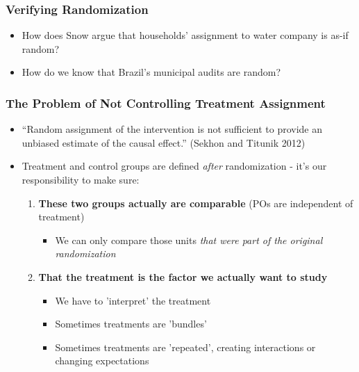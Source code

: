 \documentclass[xcolor=x11names,compress]{beamer}\usepackage[]{graphicx}\usepackage[]{color}
\renewcommand{\(}{\begin{columns}}
\renewcommand{\)}{\end{columns}}
\newcommand{\<}[1]{\begin{column}{#1}}
\renewcommand{\>}{\end{column}}
\begin{document}
\begin{frame}
\frametitle{Verifying Randomization}
\begin{itemize}
\item How does Snow argue that households' assignment to water company is as-if random?
\pause
\item How do we know that Brazil's municipal audits are random?
\end{itemize}
\end{frame}


\begin{frame}
\frametitle{The Problem of Not Controlling Treatment Assignment}
\begin{itemize}
\item ``Random assignment of the intervention is not sufficient to provide an unbiased estimate of the causal effect.'' (Sekhon and Titunik 2012)
\pause
\item Treatment and control groups are defined \textit{after} randomization - it's our responsibility to make sure:
\pause
\begin{enumerate}
\item \textbf{These two groups actually are comparable} (POs are independent of treatment)
\pause
\begin{itemize}
\item We can only compare those units \textit{that were part of the original randomization}
\end{itemize}
\pause
\item \textbf{That the treatment is the factor we actually want to study}
\pause
\begin{itemize}
\item We have to 'interpret' the treatment
\pause
\item Sometimes treatments are 'bundles'
\pause
\item Sometimes treatments are 'repeated', creating interactions or changing expectations
\end{itemize}
\end{enumerate}
\end{itemize}
\end{frame}
\end{document}
